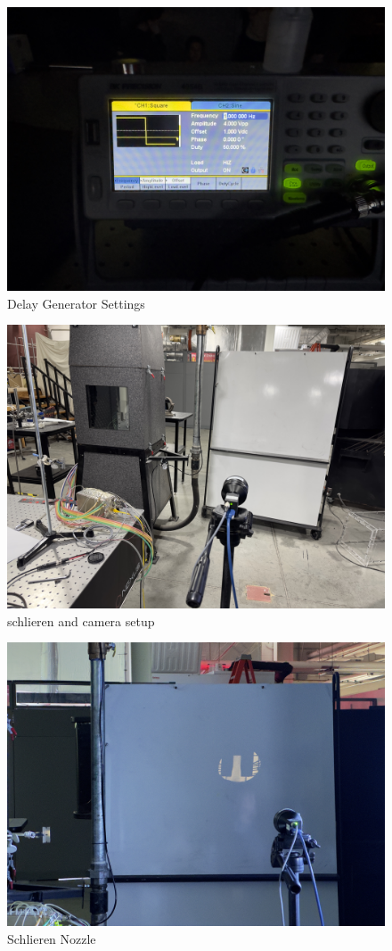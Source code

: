 \begin{figure}[htpb]
    \centering
    \includegraphics[width=0.75\linewidth]{Figures/delay_generator_settings.jpeg}
    \caption[Delay Generator Settings]{Delay Generator Settings}
    \label{fig: delayGeneratorsettings}
\end{figure}

\begin{figure}[htpb]
    \centering
    \includegraphics[width=0.75\linewidth]{Figures/schlieren_and_camera_setup.jpeg}
    \caption[schlieren and camera setup]{schlieren and camera setup}
    \label{fig: SchlierenAndCameraSetup}
\end{figure}

\begin{figure}[htpb]
    \centering
    \includegraphics[width=0.75\linewidth]{Figures/schlieren_nozzle.jpeg}
    \caption[Schlieren Nozzle]{Schlieren Nozzle}
    \label{fig: SchlierenNozzle}
\end{figure}

